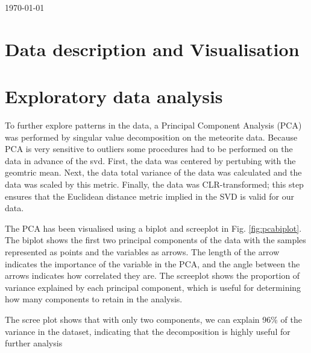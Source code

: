 \documentclass{article}
\begin{document}
\today
\tableofcontents


\section{Data description and Visualisation}\label{sec: Descript_visual} %





\section{Exploratory data analysis}\label{sec: Exploratory} %

To further explore patterns in the data, a Principal Component Analysis (PCA) was performed by singular value decomposition on the meteorite data.
Because PCA is very sensitive to outliers some procedures had to be performed on the data in advance of the svd. First,
the data was centered by pertubing with the geomtric mean. Next, 
the data total variance of the data was calculated and the data was scaled by this metric. Finally, 
the data was CLR-transformed; this step ensures that the Euclidean distance metric implied in the SVD is valid for our data.  

The PCA has been visualised using a biplot and screeplot in Fig. \ref{fig:pcabiplot}. The biplot shows the first two principal components of the data with the samples
represented as points and the variables as arrows. The length of the arrow indicates the importance of the variable in the PCA, and the angle between the arrows indicates how correlated they are.
The screeplot shows the proportion of variance explained by each principal component, which is useful for determining how many components to retain in the analysis. 

The scree plot shows that with only two components, we can explain 96\% of the variance in the dataset, indicating that the decomposition is highly useful for further analysis














\newpage{}
\end{document}
